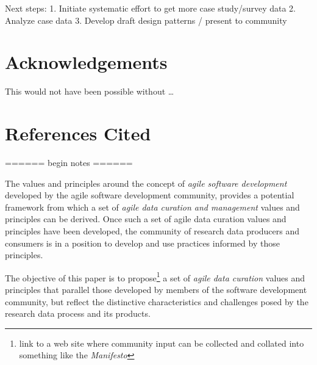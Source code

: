 \documentclass[paper]{ijdc-v9}
\begin{document}
Next steps: 1. Initiate systematic effort to get more case study/survey
data 2. Analyze case data 3. Develop draft design patterns / present to
community

\section{Acknowledgements}\label{acknowledgements}

This would not have been possible without \ldots{}

\section{References Cited}\label{references-cited}

====== begin notes ======

The values and principles around the concept of \emph{agile software
development} developed by the agile software development community,
provides a potential framework from which a set of \emph{agile data
curation and management} values and principles can be derived. Once such
a set of agile data curation values and principles have been developed,
the community of research data producers and consumers is in a position
to develop and use practices informed by those principles.

The objective of this paper is to propose\footnote{link to a web site
  where community input can be collected and collated into something
  like the \emph{Manifesto}} a set of \emph{agile data curation} values
and principles that parallel those developed by members of the software
development community, but reflect the distinctive characteristics and
challenges posed by the research data process and its products.
\end{document}
